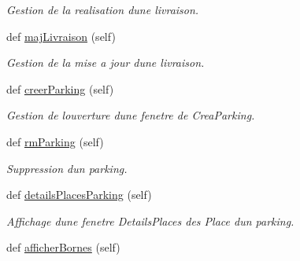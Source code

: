 \begin{DoxyCompactItemize}
\begin{DoxyCompactList}\small\item\em Gestion de la realisation d\textquotesingle{}une livraison. \end{DoxyCompactList}\item 
\hypertarget{classsrc_1_1c_1_1_main_1_1_main_a263d51d7cbc92891cb6d58e6fb470c80}{}def \hyperlink{classsrc_1_1c_1_1_main_1_1_main_a263d51d7cbc92891cb6d58e6fb470c80}{maj\+Livraison} (self)\label{classsrc_1_1c_1_1_main_1_1_main_a263d51d7cbc92891cb6d58e6fb470c80}

\begin{DoxyCompactList}\small\item\em Gestion de la mise a jour d\textquotesingle{}une livraison. \end{DoxyCompactList}\item 
\hypertarget{classsrc_1_1c_1_1_main_1_1_main_a1ee1f03e6a1430b29ac8db2bd2bf0e57}{}def \hyperlink{classsrc_1_1c_1_1_main_1_1_main_a1ee1f03e6a1430b29ac8db2bd2bf0e57}{creer\+Parking} (self)\label{classsrc_1_1c_1_1_main_1_1_main_a1ee1f03e6a1430b29ac8db2bd2bf0e57}

\begin{DoxyCompactList}\small\item\em Gestion de l\textquotesingle{}ouverture d\textquotesingle{}une fenetre de Crea\+Parking. \end{DoxyCompactList}\item 
\hypertarget{classsrc_1_1c_1_1_main_1_1_main_a7aed67b846945ffa734567898e4c7aff}{}def \hyperlink{classsrc_1_1c_1_1_main_1_1_main_a7aed67b846945ffa734567898e4c7aff}{rm\+Parking} (self)\label{classsrc_1_1c_1_1_main_1_1_main_a7aed67b846945ffa734567898e4c7aff}

\begin{DoxyCompactList}\small\item\em Suppression d\textquotesingle{}un parking. \end{DoxyCompactList}\item 
\hypertarget{classsrc_1_1c_1_1_main_1_1_main_aa4ac57aeac0cbb7ed9ce53c2bda1de81}{}def \hyperlink{classsrc_1_1c_1_1_main_1_1_main_aa4ac57aeac0cbb7ed9ce53c2bda1de81}{details\+Places\+Parking} (self)\label{classsrc_1_1c_1_1_main_1_1_main_aa4ac57aeac0cbb7ed9ce53c2bda1de81}

\begin{DoxyCompactList}\small\item\em Affichage d\textquotesingle{}une fenetre Details\+Places des Place d\textquotesingle{}un parking. \end{DoxyCompactList}\item 
\hypertarget{classsrc_1_1c_1_1_main_1_1_main_a018aaa4bdd0bf4e2525b1f9272eb0397}{}def \hyperlink{classsrc_1_1c_1_1_main_1_1_main_a018aaa4bdd0bf4e2525b1f9272eb0397}{afficher\+Bornes} (self)\label{classsrc_1_1c_1_1_main_1_1_main_a018aaa4bdd0bf4e2525b1f9272eb0397}


\end{DoxyCompactItemize}
